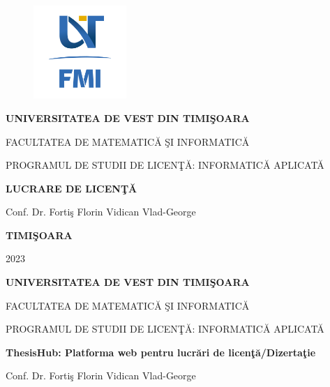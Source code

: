 \documentclass[12pt,a4paper,hidelinks]{report}
\theoremstyle{definition}
\theoremstyle{remark}
\begin{document}
\thispagestyle{empty}
\begin{center}
\begin{figure}[h!]
\vspace{-20pt}
\begin{center}
\includegraphics[width=100pt]{images/FMI-03.png}
\end{center}
\end{figure}


{\large{\bf UNIVERSITATEA DE VEST DIN TIMI\c SOARA

FACULTATEA DE MATEMATIC\u A \c SI INFORMATIC\u A

PROGRAMUL DE STUDII DE LICEN\c T\u A: INFORMATIC\u A APLICAT\u A}}

\vspace{120pt}
{\huge {\bf LUCRARE DE LICEN\c T\u A}}

\vspace{150pt}
\end{center}

{\large{}

\noindent Conf. Dr. Forti\c s Florin \hfill Vidican Vlad-George}

\vfill
\begin{center}
{\bf TIMI\c SOARA

2023}
\end{center}
\newpage
\thispagestyle{empty}
\begin{center}
{\large{\bf UNIVERSITATEA DE VEST DIN TIMI\c SOARA

FACULTATEA DE MATEMATIC\u A \c SI INFORMATIC\u A

PROGRAMUL DE STUDII DE LICEN\c T\u A: INFORMATIC\u A APLICAT\u A}}

\vspace{120pt}
{\huge {\bf ThesisHub: Platforma web pentru lucr\u ari de licen\c t\u a/Dizerta\c tie}}

\vspace{150pt}
\end{center}

{\large{}

\noindent Conf. Dr. Forti\c s Florin \hfill Vidican Vlad-George}
\end{document}
